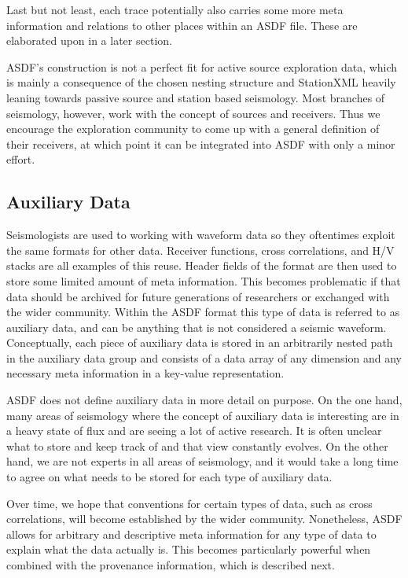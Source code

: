 Last but not least, each trace potentially also carries some more meta
information and relations to other places within an ASDF file. These are
elaborated upon in a later section.

ASDF's construction is not a perfect fit for active source exploration data,
which is mainly a consequence of the chosen nesting structure and StationXML
heavily leaning towards passive source and station based seismology. Most
branches of seismology, however, work with the concept of sources and
receivers.  Thus we encourage the exploration community to come up with a
general definition of their receivers, at which point it can be integrated into
ASDF with only a minor effort.

\subsection{Auxiliary Data}

Seismologists are used to working with waveform data so they oftentimes exploit
the same formats for other data. Receiver functions, cross correlations, and
H/V stacks are all examples of this reuse. Header fields of the format are then
used to store some limited amount of meta information. This becomes problematic
if that data should be archived for future generations of researchers or
exchanged with the wider community. Within the ASDF format this type of data is
referred to as auxiliary data, and can be anything that is not considered a
seismic waveform. Conceptually, each piece of auxiliary data is stored in an
arbitrarily nested path in the auxiliary data group and consists of a data
array of any dimension and any necessary meta information in a key-value
representation.

ASDF does not define auxiliary data in more detail on purpose. On the one hand,
many areas of seismology where the concept of auxiliary data is interesting are
in a heavy state of flux and are seeing a lot of active research. It is often
unclear what to store and keep track of and that view constantly evolves. On
the other hand, we are not experts in all areas of seismology, and it would
take a long time to agree on what needs to be stored for each type of auxiliary
data.

Over time, we hope that conventions for certain types of data, such as cross
correlations, will become established by the wider community. Nonetheless, ASDF
allows for arbitrary and descriptive meta information for any type of data to
explain what the data actually is. This becomes particularly powerful when
combined with the provenance information, which is described next.


